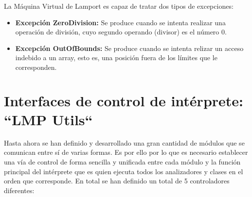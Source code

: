 \vspace{0.5cm}
\noindent
La Máquina Virtual de Lamport es capaz de tratar dos tipos de excepciones:
\begin{itemize}
    \item \textbf{Excepción ZeroDivision:} Se produce cuando se intenta realizar una operación de división, cuyo segundo operando (divisor) es el número 0.
    \item \textbf{Excepción OutOfBounds:} Se produce cuando se intenta relizar un acceso indebido a un array, esto es, una posición fuera de los límites que le corresponden.
\end{itemize}

\section{Interfaces de control de intérprete: ``LMP Utils``}\label{sec:implementacionLMPUtils}
Hasta ahora se han definido y desarrollado una gran cantidad de módulos que se comunican entre sí de varias formas. Es por ello por lo que es necesario establecer una vía de control de forma sencilla y unificada entre cada módulo y la función principal del intérprete que es quien ejecuta todos los analizadores y clases en el orden que corresponde. En total se han definido un total de 5 controladores diferentes:

